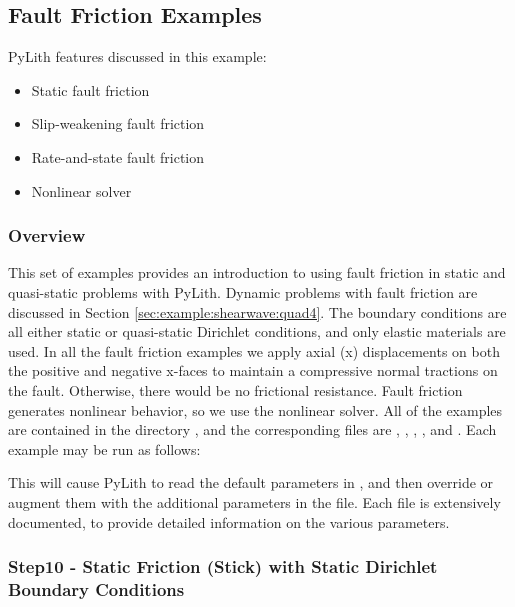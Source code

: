 \subsection{Fault Friction Examples}
\label{sec:example:3dhex8:friction}

PyLith features discussed in this example:
\begin{itemize}
\item Static fault friction
\item Slip-weakening fault friction
\item Rate-and-state fault friction
\item Nonlinear solver
\end{itemize}

\subsubsection{Overview}

This set of examples provides an introduction to using fault friction
in static and quasi-static problems with PyLith. Dynamic problems
with fault friction are discussed in Section \vref{sec:example:shearwave:quad4}.
The boundary conditions are all either static or quasi-static Dirichlet
conditions, and only elastic materials are used. In all the fault
friction examples we apply axial (x) displacements on both the positive
and negative x-faces to maintain a compressive normal tractions on
the fault. Otherwise, there would be no frictional resistance. Fault
friction generates nonlinear behavior, so we use the nonlinear solver.
All of the examples are contained in the directory ,
and the corresponding  files are ,
, , , and
. Each example may be run as follows:
This will cause PyLith to read the default parameters in ,
and then override or augment them with the additional parameters in
the  file. Each  file is extensively
documented, to provide detailed information on the various parameters.


\subsubsection{Step10 - Static Friction (Stick) with Static Dirichlet Boundary Conditions}

